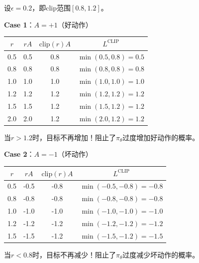 \documentclass[11pt,a4paper]{article}
\theoremstyle{definition}
\begin{document}
\begin{calculation}[Clip目标的解析]
设$\epsilon = 0.2$，即clip范围$[0.8, 1.2]$。

\textbf{Case 1}：$A = +1$（好动作）

\begin{center}
\begin{tabular}{c|c|c|c}
\toprule
$r$ & $rA$ & $\text{clip}(r)A$ & $L^{\text{CLIP}}$ \\
\midrule
0.5 & 0.5 & 0.8 & $\min(0.5, 0.8) = 0.5$ \\
0.8 & 0.8 & 0.8 & $\min(0.8, 0.8) = 0.8$ \\
1.0 & 1.0 & 1.0 & $\min(1.0, 1.0) = 1.0$ \\
1.2 & 1.2 & 1.2 & $\min(1.2, 1.2) = 1.2$ \\
1.5 & 1.5 & 1.2 & $\min(1.5, 1.2) = 1.2$ \\
2.0 & 2.0 & 1.2 & $\min(2.0, 1.2) = 1.2$ \\
\bottomrule
\end{tabular}
\end{center}

当$r > 1.2$时，目标不再增加！阻止了$\pi_\theta$过度增加好动作的概率。

\textbf{Case 2}：$A = -1$（坏动作）

\begin{center}
\begin{tabular}{c|c|c|c}
\toprule
$r$ & $rA$ & $\text{clip}(r)A$ & $L^{\text{CLIP}}$ \\
\midrule
0.5 & -0.5 & -0.8 & $\min(-0.5, -0.8) = -0.8$ \\
0.8 & -0.8 & -0.8 & $\min(-0.8, -0.8) = -0.8$ \\
1.0 & -1.0 & -1.0 & $\min(-1.0, -1.0) = -1.0$ \\
1.2 & -1.2 & -1.2 & $\min(-1.2, -1.2) = -1.2$ \\
1.5 & -1.5 & -1.2 & $\min(-1.5, -1.2) = -1.5$ \\
\bottomrule
\end{tabular}
\end{center}

当$r < 0.8$时，目标不再减少！阻止了$\pi_\theta$过度减少坏动作的概率。
\end{calculation}
\end{document}
